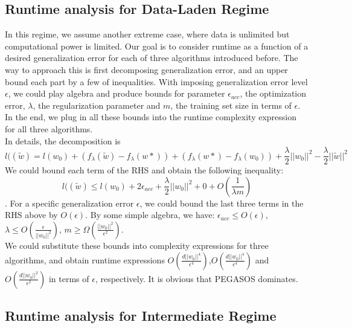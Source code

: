 \documentclass[11pt,a4paper]{article}
\begin{document}
\subsection{Runtime analysis for Data-Laden Regime}

In this regime, we assume another extreme case, where data is unlimited but computational power is limited. Our goal is to consider runtime as a function of a desired generalization error for each of three algorithms introduced before. The way to approach this is first decomposing generalization error, and an upper bound each part by a few of inequalities. With imposing generalization error level $\epsilon$, we could play algebra and produce bounds for parameter $\epsilon_{acc}$, the optimization error, $\lambda$, the regularization parameter and $m$, the training set size in terms of $\epsilon$. In the end, we plug in all these bounds into the runtime complexity expression for all three algorithms.\\
In details, the decomposition is
\begin{equation*}
l((\tilde{w})=l(w_0)+(f_{\lambda}(\tilde{w})-f_{\lambda}(w*))+(f_{\lambda}(w*)-f_{\lambda}(w_0))+\frac{\lambda}{2}||w_0||^2-\frac{\lambda}{2}||\tilde{w}||^2
\end{equation*}
We could bound each term of the RHS and obtain the following inequality:
\begin{equation}
l((\tilde{w}) \leq l(w_0)+2\epsilon_{acc}+\frac{\lambda}{2}||w_0||^2+0+O(\frac{1}{\lambda m})
\label{equ1}
\end{equation}
. For a specific generalization error $\epsilon$, we could bound the last three terms in the RHS above by $O(\epsilon)$. By some simple algebra, we have:
$\epsilon_{acc} \leq O(\epsilon)$, $\lambda \leq O(\frac{\epsilon}{||w_0||^2})$, $m \geq \Omega(\frac{||w_0||^2}{\epsilon^2})$.\\
We could substitute these bounds into complexity expressions for three algorithms, and obtain runtime expressions $O(\frac{d||w_0||^4}{\epsilon^4})$,$O(\frac{d||w_0||^4}{\epsilon^4})$ and $O(\frac{d||w_0||^2}{\epsilon^2})$ in terms of $\epsilon$, respectively. It is obvious that PEGASOS dominates.

\subsection{Runtime analysis for Intermediate Regime}
\end{document}
